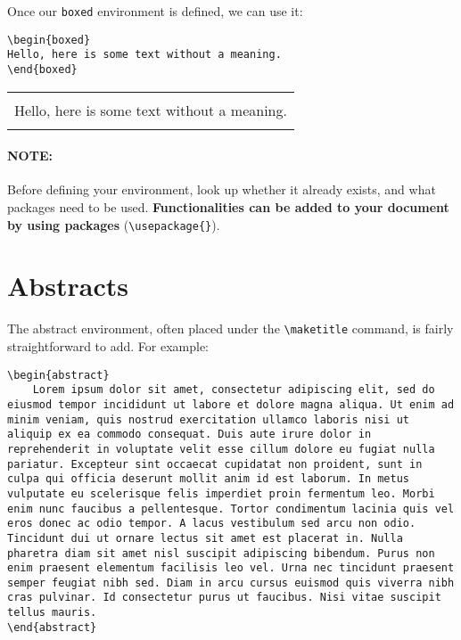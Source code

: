 \documentclass[11pt]{article}
\newenvironment{boxed}
    {\begin{center}
    \begin{tabular}{|p{0.9\textwidth}|}
    \hline\\
    }
    {
    \\\\\hline
    \end{tabular}
    \end{center}
    }
\begin{document}
\noindent Once our \verb|boxed| environment is defined, we can use it:

\begin{lstlisting}
\begin{boxed}
Hello, here is some text without a meaning.
\end{boxed}
\end{lstlisting}

\begin{boxed}
Hello, here is some text without a meaning.
\end{boxed}

\paragraph{NOTE:} Before defining your environment, look up whether it already exists, and what packages need to be used. \textbf{Functionalities can be added to your document by using packages} (\verb|\usepackage{}|).


\section{Abstracts}

The abstract environment, often placed under the \verb|\maketitle| command, is fairly straightforward to add. For example:

\begin{lstlisting}
\begin{abstract}
    Lorem ipsum dolor sit amet, consectetur adipiscing elit, sed do eiusmod tempor incididunt ut labore et dolore magna aliqua. Ut enim ad minim veniam, quis nostrud exercitation ullamco laboris nisi ut aliquip ex ea commodo consequat. Duis aute irure dolor in reprehenderit in voluptate velit esse cillum dolore eu fugiat nulla pariatur. Excepteur sint occaecat cupidatat non proident, sunt in culpa qui officia deserunt mollit anim id est laborum. In metus vulputate eu scelerisque felis imperdiet proin fermentum leo. Morbi enim nunc faucibus a pellentesque. Tortor condimentum lacinia quis vel eros donec ac odio tempor. A lacus vestibulum sed arcu non odio. Tincidunt dui ut ornare lectus sit amet est placerat in. Nulla pharetra diam sit amet nisl suscipit adipiscing bibendum. Purus non enim praesent elementum facilisis leo vel. Urna nec tincidunt praesent semper feugiat nibh sed. Diam in arcu cursus euismod quis viverra nibh cras pulvinar. Id consectetur purus ut faucibus. Nisi vitae suscipit tellus mauris.
\end{abstract}
\end{lstlisting}
\end{document}
